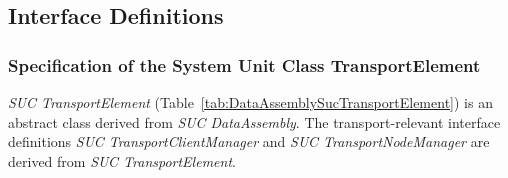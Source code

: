 \subsection{Interface Definitions}
\label{subsec:AnhangTransportSetSchnittstellen}

\subsubsection{Specification of the System Unit Class TransportElement}

\emph{SUC TransportElement} (Table~\ref{tab:DataAssemblySucTransportElement}) is an abstract class derived from \emph{SUC DataAssembly}. The transport-relevant interface definitions \emph{SUC TransportClientManager} and \emph{SUC TransportNodeManager} are derived from \emph{SUC TransportElement}.

